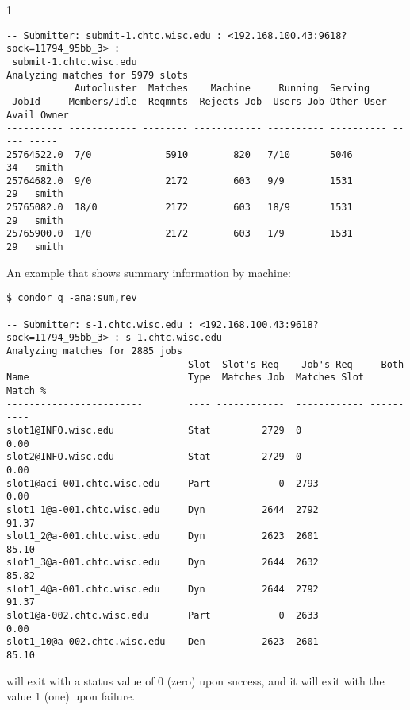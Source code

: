 \begin{ManPage}{\label{man-condor-q}}{1}
\begin{verbatim}
-- Submitter: submit-1.chtc.wisc.edu : <192.168.100.43:9618?sock=11794_95bb_3> :
 submit-1.chtc.wisc.edu
Analyzing matches for 5979 slots
            Autocluster  Matches    Machine     Running  Serving
 JobId     Members/Idle  Reqmnts  Rejects Job  Users Job Other User Avail Owner
---------- ------------ -------- ------------ ---------- ---------- ----- -----
25764522.0  7/0             5910        820   7/10       5046        34   smith
25764682.0  9/0             2172        603   9/9        1531        29   smith
25765082.0  18/0            2172        603   18/9       1531        29   smith
25765900.0  1/0             2172        603   1/9        1531        29   smith 
\end{verbatim}
\normalsize

An example that shows summary information by machine:
\footnotesize
\begin{verbatim}
$ condor_q -ana:sum,rev

-- Submitter: s-1.chtc.wisc.edu : <192.168.100.43:9618?sock=11794_95bb_3> : s-1.chtc.wisc.edu
Analyzing matches for 2885 jobs
                                Slot  Slot's Req    Job's Req     Both
Name                            Type  Matches Job  Matches Slot    Match %
------------------------        ---- ------------  ------------ ----------
slot1@INFO.wisc.edu             Stat         2729  0                  0.00
slot2@INFO.wisc.edu             Stat         2729  0                  0.00
slot1@aci-001.chtc.wisc.edu     Part            0  2793               0.00
slot1_1@a-001.chtc.wisc.edu     Dyn          2644  2792              91.37
slot1_2@a-001.chtc.wisc.edu     Dyn          2623  2601              85.10
slot1_3@a-001.chtc.wisc.edu     Dyn          2644  2632              85.82
slot1_4@a-001.chtc.wisc.edu     Dyn          2644  2792              91.37
slot1@a-002.chtc.wisc.edu       Part            0  2633               0.00
slot1_10@a-002.chtc.wisc.edu    Den          2623  2601              85.10 
\end{verbatim}
\normalsize

\ExitStatus

 will exit with a status value of 0 (zero) upon success,
and it will exit with the value 1 (one) upon failure.

\end{ManPage}
